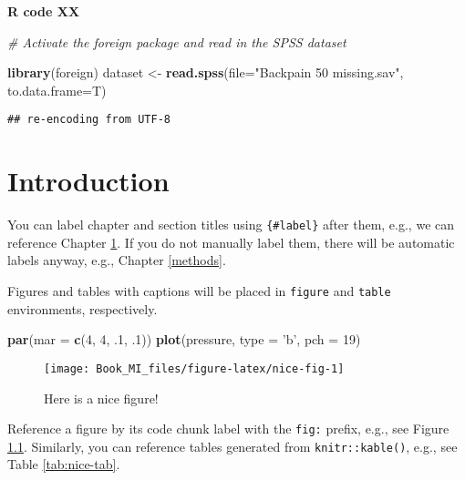 \documentclass[]{book}
\newenvironment{Shaded}{\begin{snugshade}}{\end{snugshade}}
\newcommand{\KeywordTok}[1]{\textcolor[rgb]{0.13,0.29,0.53}{\textbf{#1}}}
\newcommand{\DataTypeTok}[1]{\textcolor[rgb]{0.13,0.29,0.53}{#1}}
\newcommand{\DecValTok}[1]{\textcolor[rgb]{0.00,0.00,0.81}{#1}}
\newcommand{\StringTok}[1]{\textcolor[rgb]{0.31,0.60,0.02}{#1}}
\newcommand{\CommentTok}[1]{\textcolor[rgb]{0.56,0.35,0.01}{\textit{#1}}}
\newcommand{\NormalTok}[1]{#1}
\theoremstyle{definition}
\theoremstyle{definition}
\theoremstyle{definition}
\theoremstyle{remark}
\begin{document}
\textbf{R code XX}

\begin{Shaded}
\begin{Highlighting}[]
\CommentTok{# Activate the foreign package and read in the SPSS dataset}

\KeywordTok{library}\NormalTok{(foreign)}
\NormalTok{dataset <-}\StringTok{ }\KeywordTok{read.spss}\NormalTok{(}\DataTypeTok{file=}\StringTok{"Backpain 50 missing.sav"}\NormalTok{, }\DataTypeTok{to.data.frame=}\NormalTok{T)}
\end{Highlighting}
\end{Shaded}

\begin{verbatim}
## re-encoding from UTF-8
\end{verbatim}

\chapter{Introduction}\label{intro}

You can label chapter and section titles using \texttt{\{\#label\}}
after them, e.g., we can reference Chapter \ref{intro}. If you do not
manually label them, there will be automatic labels anyway, e.g.,
Chapter \ref{methods}.

Figures and tables with captions will be placed in \texttt{figure} and
\texttt{table} environments, respectively.

\begin{Shaded}
\begin{Highlighting}[]
\KeywordTok{par}\NormalTok{(}\DataTypeTok{mar =} \KeywordTok{c}\NormalTok{(}\DecValTok{4}\NormalTok{, }\DecValTok{4}\NormalTok{, .}\DecValTok{1}\NormalTok{, .}\DecValTok{1}\NormalTok{))}
\KeywordTok{plot}\NormalTok{(pressure, }\DataTypeTok{type =} \StringTok{'b'}\NormalTok{, }\DataTypeTok{pch =} \DecValTok{19}\NormalTok{)}
\end{Highlighting}
\end{Shaded}

\begin{figure}

{\centering \texttt{[image: Book\_MI\_files/figure-latex/nice-fig-1]} 

}

\caption{Here is a nice figure!}\label{fig:nice-fig}
\end{figure}

Reference a figure by its code chunk label with the \texttt{fig:}
prefix, e.g., see Figure \ref{fig:nice-fig}. Similarly, you can
reference tables generated from \texttt{knitr::kable()}, e.g., see Table
\ref{tab:nice-tab}.
\end{document}
